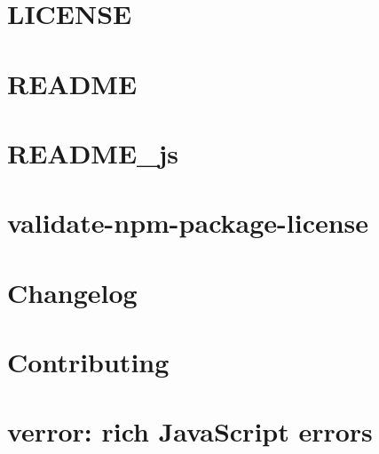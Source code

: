 \documentclass[twoside]{book}
\newcommand{\+}{\discretionary{\mbox{\scriptsize$\hookleftarrow$}}{}{}}
\begin{document}
\chapter{L\+I\+C\+E\+N\+SE}
\label{md_dsmacc_vis_degree_node_modules_uuid_LICENSE}

\chapter{R\+E\+A\+D\+ME}
\label{md_dsmacc_vis_degree_node_modules_uuid_README}

\chapter{R\+E\+A\+D\+M\+E\+\_\+js}
\label{md_dsmacc_vis_degree_node_modules_uuid_README_js}

\chapter{validate-\/npm-\/package-\/license}
\label{md_dsmacc_vis_degree_node_modules_validate-npm-package-license_README}

\chapter{Changelog}
\label{md_dsmacc_vis_degree_node_modules_verror_CHANGES}

\chapter{Contributing}
\label{md_dsmacc_vis_degree_node_modules_verror_CONTRIBUTING}

\chapter{verror\+: rich Java\+Script errors}
\label{md_dsmacc_vis_degree_node_modules_verror_README}

\end{document}

